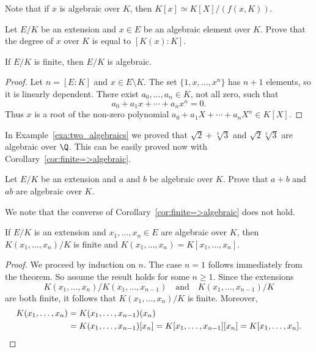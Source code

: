 Note that if $x$ is algebraic over $K$, then
$K[x]\simeq K[X]/(f(x,K))$. 

\begin{exercise}
\label{xca:degree_of_x}
    Let $E/K$ be an extension and $x\in E$ be an algebraic element over $K$.
    Prove that the degree of $x$ over $K$ is equal to $[K(x):K]$. 
\end{exercise}

\begin{corollary}
\label{cor:finite=>algebraic}
	If $E/K$ is finite, then $E/K$ is algebraic. 
\end{corollary}

\begin{proof}
	Let $n=[E:K]$ and $x\in E\setminus K$. The set $\{1,x,\dots,x^n\}$ has $n+1$ elements, so it is linearly dependent. 
	There exist $a_0,\dots,a_n\in K$, not all zero, such that
	\[
        a_0+a_1x+\cdots+a_nx^n=0.
        \]
        Thus $x$ is a root of the non-zero
	polynomial $a_0+a_1X+\cdots+a_nX^n\in K[X]$. 
\end{proof}

In Example~\ref{exa:two_algebraics} we 
proved that $\sqrt{2}+\sqrt[3]{3}$ and $\sqrt{2}\sqrt[3]{3}$ 
are algebraic over $\Q$. This can be easily proved
now with Corollary~\ref{cor:finite=>algebraic}. 

\begin{exercise}
\label{xca:algebraic}
    Let $E/K$ be an extension and 
    $a$ and $b$ be algebraic over $K$. Prove 
    that $a+b$ and $ab$ are algebraic over $K$. 
\end{exercise}

We note that the converse of Corollary~\ref{cor:finite=>algebraic} does not hold. 

\begin{corollary}
\label{cor:finite type finite}
	If $E/K$ is an extension and $x_1,\dots,x_n\in E$ 
	are algebraic over $K$, then 
	$K(x_1,\dots,x_n)/K$ is finite and
	$K(x_1,\dots,x_n)=K[x_1,\dots,x_n]$. 
\end{corollary}

\begin{proof}
	We proceed by induction on $n$. The case $n=1$ follows immediately from 
	the theorem. So assume the result holds for some $n\geq1$. Since the extensions 
	\[
    K(x_1,\dots,x_n)/K(x_1,\dots,x_{n-1})\quad\text{and}\quad 
    K(x_1,\dots,x_{n-1})/K
    \]
    are
	both finite, it follows that $K(x_1,\dots,x_n)/K$ is finite. Moreover, 
	\begin{align*}
	K(x_1,\dots,x_n)&=K(x_1,\dots,x_{n-1})(x_n)\\
	&=K(x_1,\dots,x_{n-1})[x_n]=K[x_1,\dots,x_{n-1}][x_n]=K[x_1,\dots,x_n].\qedhere
    \end{align*}
\end{proof}

